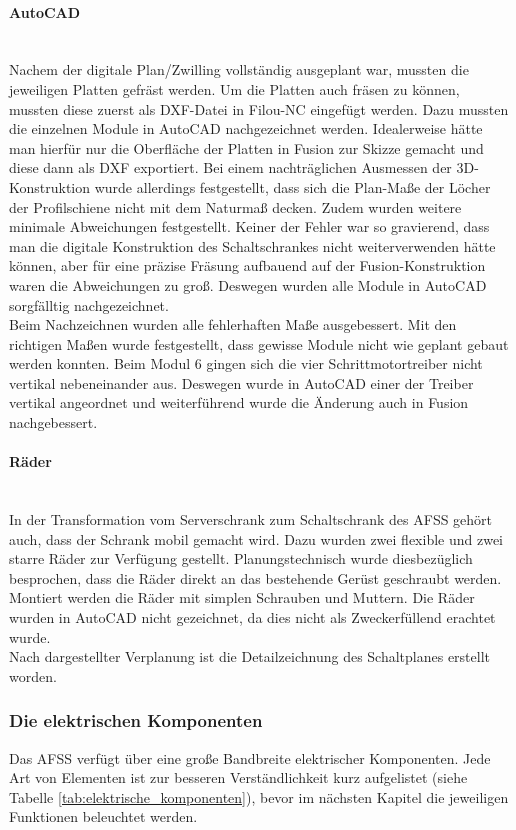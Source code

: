     \paragraph{AutoCAD}\mbox{}\\
    \label{AutoCAD}
    Nachem der digitale Plan/Zwilling vollständig ausgeplant war, mussten die jeweiligen Platten gefräst werden. Um die Platten auch fräsen zu können, mussten diese zuerst als DXF-Datei in Filou-NC eingefügt werden. Dazu mussten die einzelnen Module in AutoCAD nachgezeichnet werden. Idealerweise hätte man hierfür nur die Oberfläche der Platten in Fusion zur Skizze gemacht und diese dann als DXF exportiert. Bei einem nachträglichen Ausmessen der 3D-Konstruktion wurde allerdings festgestellt, dass sich die Plan-Maße der Löcher der Profilschiene nicht mit dem Naturmaß decken. Zudem wurden weitere minimale Abweichungen festgestellt. Keiner der Fehler war so gravierend, dass man die digitale Konstruktion des Schaltschrankes nicht weiterverwenden hätte können, aber für eine präzise Fräsung aufbauend auf der Fusion-Konstruktion waren die Abweichungen zu groß. Deswegen wurden alle Module in AutoCAD sorgfälltig nachgezeichnet.\\     
    Beim Nachzeichnen wurden alle fehlerhaften Maße ausgebessert. Mit den richtigen Maßen wurde festgestellt, dass gewisse Module nicht wie geplant gebaut werden konnten. Beim Modul 6 gingen sich die vier Schrittmotortreiber nicht vertikal nebeneinander aus. Deswegen wurde in AutoCAD einer der Treiber vertikal angeordnet und weiterführend wurde die Änderung auch in Fusion nachgebessert.
    \paragraph{Räder}\mbox{}\\
    In der Transformation vom Serverschrank zum Schaltschrank des AFSS gehört auch, dass der Schrank mobil gemacht wird. Dazu wurden zwei flexible und zwei starre Räder zur Verfügung gestellt. Planungstechnisch wurde diesbezüglich besprochen, dass die Räder direkt an das bestehende Gerüst geschraubt werden. Montiert werden die Räder mit simplen Schrauben und Muttern. Die Räder wurden in AutoCAD nicht gezeichnet, da dies nicht als Zweckerfüllend erachtet wurde.\\
    Nach dargestellter Verplanung ist die Detailzeichnung des Schaltplanes erstellt worden.
    \newpage
\subsubsection{Die elektrischen Komponenten}
\label{sec:Die elektrischen Komponenten}
    Das AFSS verfügt über eine große  Bandbreite elektrischer Komponenten. Jede Art von Elementen ist zur besseren Verständlichkeit kurz aufgelistet (siehe Tabelle \ref{tab:elektrische_komponenten}), bevor im nächsten Kapitel die jeweiligen Funktionen beleuchtet werden.
